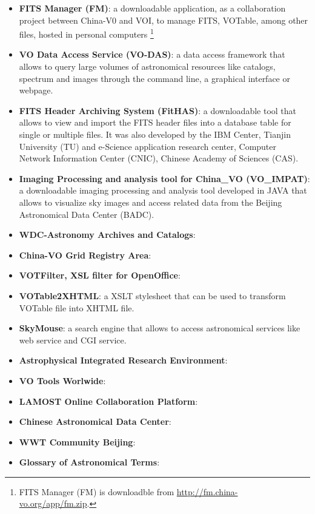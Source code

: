 \begin{itemize}
\item \textbf{FITS Manager (FM)}:
a downloadable application, as a collaboration project between China-V0 and VOI,
to manage FITS, VOTable, among other files, hosted in personal computers
\footnote{FITS Manager (FM) is downloadble from
\url{http://fm.china-vo.org/app/fm.zip}.} 

\item \textbf{VO Data Access Service (VO-DAS)}:
a data access framework that allows to query large volumes of astronomical
resources like catalogs, spectrum and images through the command line, a
graphical interface or webpage.

\item \textbf{FITS Header Archiving System (FitHAS)}:
a downloadable tool that allows to view and import the FITS header files into a
database table for single or multiple files. It was also developed by the IBM
Center, Tianjin University (TU) and e-Science application research center,
Computer Network Information Center (CNIC), Chinese Academy of Sciences (CAS).

\item \textbf{Imaging Processing and analysis tool for China\_VO (VO\_IMPAT)}:
a downloadable imaging processing and analysis tool developed in JAVA that
allows to visualize sky images and access related data from the Beijing
Astronomical Data Center (BADC). 

\item \textbf{WDC-Astronomy Archives and Catalogs}:

\item \textbf{China-VO Grid Registry Area}:

\item \textbf{VOTFilter, XSL filter for OpenOffice}:

\item \textbf{VOTable2XHTML}:
a XSLT stylesheet that can be used to transform VOTable file into XHTML file.

\item \textbf{SkyMouse}:
a search engine that allows to access astronomical services like web service and
CGI service.

\item \textbf{Astrophysical Integrated Research Environment}:

\item \textbf{VO Tools Worlwide}:

\item \textbf{LAMOST Online Collaboration Platform}:

\item \textbf{Chinese Astronomical Data Center}:

\item \textbf{WWT Community Beijing}:

\item \textbf{Glossary of Astronomical Terms}:
\end{itemize}

